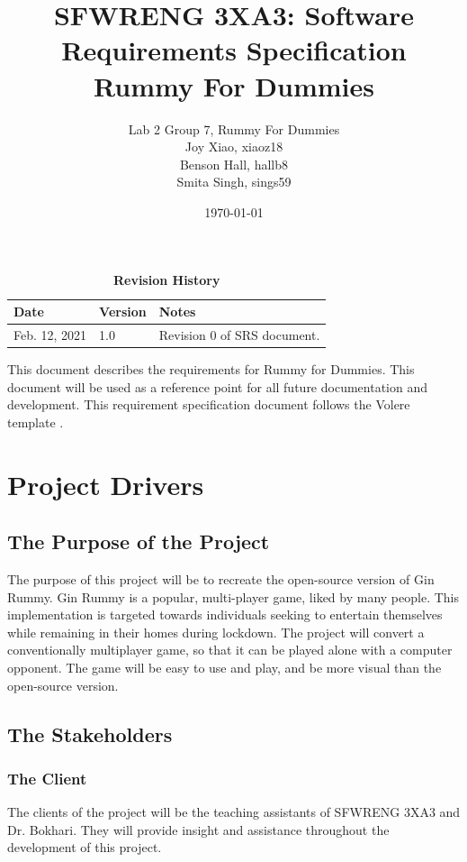 \documentclass[12pt, titlepage]{article}
\title{SFWRENG 3XA3: Software Requirements Specification\\Rummy For Dummies}
\author{Lab 2 Group 7, Rummy For Dummies
		\\ Joy Xiao, xiaoz18
		\\ Benson Hall, hallb8
		\\ Smita Singh, sings59
}
\date{\today}
\begin{document}
\maketitle

\tableofcontents
\listoftables
\listoffigures

\begin{table}[bp]
\caption{\bf Revision History}
\begin{tabularx}{\textwidth}{p{3cm}p{2cm}X}
\toprule {\bf Date} & {\bf Version} & {\bf Notes}\\
\midrule
Feb. 12, 2021 & 1.0 & Revision 0 of SRS document.\\
\bottomrule
\end{tabularx}
\end{table}

\newpage


This document describes the requirements for Rummy for Dummies.
This document will be used as a reference point for all future documentation and development. This requirement specification document follows the Volere template \cite{volere}.

\section{Project Drivers}

\subsection{The Purpose of the Project}
The purpose of this project will be to recreate the open-source version of Gin Rummy. Gin Rummy is a popular, multi-player game, liked by many people. This implementation is targeted towards individuals seeking to entertain themselves while remaining in their homes during lockdown. The project will convert a conventionally multiplayer game, so that it can be played alone with a computer opponent. The game will be easy to use and play, and be more visual than the open-source version.

\subsection{The Stakeholders}

\subsubsection{The Client}
The clients of the project will be the teaching assistants of SFWRENG 3XA3 and Dr. Bokhari. They will provide insight and assistance throughout the development of this project.
\end{document}
